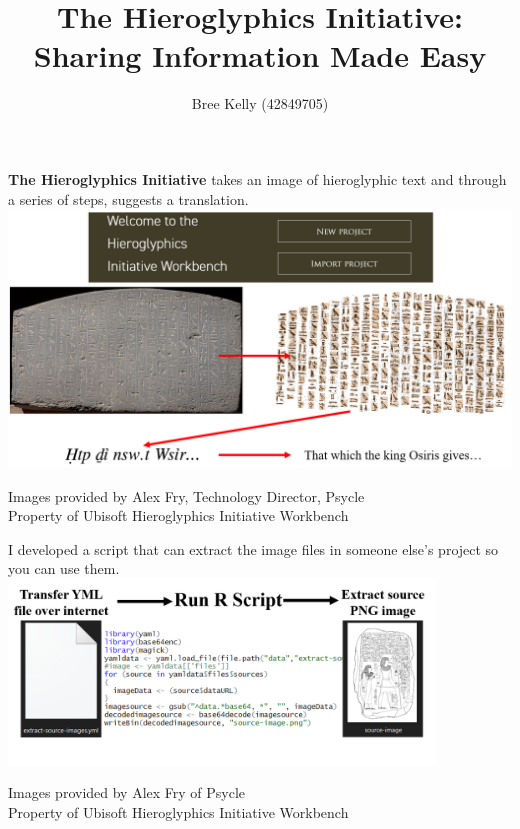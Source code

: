 \documentclass[unknownkeysallowed,usepdftitle=false, parskip=full, aspectratio=169]{beamer}
\title{The Hieroglyphics Initiative: Sharing Information Made Easy}
\author{Bree Kelly (42849705)}
\newcommand{\secvariable}{nothing}
\newcommand{\mysection}[1]{\renewcommand{\secvariable}{#1}
}
\begin{document}
\mysection{abstract}

\begin{frame}\label{\secvariable}


\begin{center}
\textbf{The Hieroglyphics Initiative} takes an image of hieroglyphic text and through a series of steps, suggests a translation.
\includegraphics[width=1\textwidth,height=0.75\textheight,keepaspectratio]{figure/PICO_33.PNG}
\end{center}
\vfill
\parbox{\linewidth}{\tiny Images provided by Alex Fry, Technology Director, Psycle
\\Property of Ubisoft Hieroglyphics Initiative Workbench}

\end{frame}



\begin{frame}\label{\secvariable}

\begin{center}
I developed a script that can extract the image files in someone else's project so you can use them.
\vfill
\includegraphics[width=0.85\textwidth,keepaspectratio]{figure/PICO_34.PNG}
\end{center}
\parbox{\linewidth}{\tiny Images provided by Alex Fry of Psycle
\\Property of Ubisoft Hieroglyphics Initiative Workbench}
\vfill
\end{frame}
\end{document}
